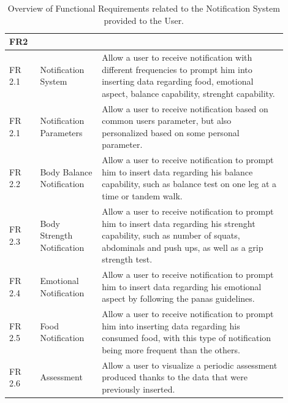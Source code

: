 \begin{table}[h!]
    \setstretch{\myspacing}
    \centering
    \begin{tabular}{|>{\raggedright\arraybackslash}p{0.1\linewidth}|>{\raggedright\arraybackslash}p{0.2\linewidth}|>{\raggedright\arraybackslash}p{0.6\linewidth}|}
        \hline
        \textbf{FR2} & \multicolumn{2}{>{\centering\arraybackslash}p{0.7\linewidth}|}{\textbf{Notification System}} \\
        \hline
        FR 2.1 & Notification System & Allow a user to receive notification with different frequencies to prompt him into inserting data regarding food, emotional aspect, balance capability, strenght capability. \\
        \hline
        FR 2.1 & Notification Parameters & Allow a user to receive notification based on common users parameter, but also personalized based on some personal parameter. \\
        \hline
        FR 2.2 & Body Balance Notification & Allow a user to receive notification to prompt him to insert data regarding his balance capability, such as balance test on one leg at a time or tandem walk. \\
        \hline
        FR 2.3 & Body Strength Notification & Allow a user to receive notification to prompt him to insert data regarding his strenght capability, such as number of squats, abdominals and push ups, as well as a grip strength test. \\
        \hline
        FR 2.4 & Emotional Notification & Allow a user to receive notification to prompt him to insert data regarding his emotional aspect by following the panas guidelines. \\
        \hline
        FR 2.5 & Food Notification & Allow a user to receive notification to prompt him into inserting data regarding his consumed food, with this type of notification being more frequent than the others. \\
        \hline
        FR 2.6 & Assessment & Allow a user to visualize a periodic assessment produced thanks to the data that were previously inserted. \\
        \hline
    \end{tabular}
    \caption{Overview of Functional Requirements related to the Notification System provided to the User.}
    \label{tab:fr2}
\end{table}

